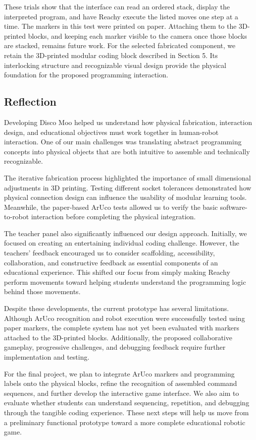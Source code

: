 \documentclass[conference]{IEEEtran}
\begin{document}
These trials show that the interface can read an ordered stack, display the interpreted program, and have Reachy execute the listed moves one step at a time. The markers in this test were printed on paper. Attaching them to the 3D-printed blocks, and keeping each marker visible to the camera once those blocks are stacked, remains future work. For the selected fabricated component, we retain the 3D-printed modular coding block described in Section 5. Its interlocking structure and recognizable visual design provide the physical foundation for the proposed programming interaction.



\subsection{Reflection}

Developing Disco Moo helped us understand how physical fabrication, interaction design, and educational objectives must work together in human-robot interaction. One of our main challenges was translating abstract programming concepts into physical objects that are both intuitive to assemble and technically recognizable.

The iterative fabrication process highlighted the importance of small dimensional adjustments in 3D printing. Testing different socket tolerances demonstrated how physical connection design can influence the usability of modular learning tools. Meanwhile, the paper-based ArUco tests allowed us to verify the basic software-to-robot interaction before completing the physical integration.

The teacher panel also significantly influenced our design approach. Initially, we focused on creating an entertaining individual coding challenge. However, the teachers' feedback encouraged us to consider scaffolding, accessibility, collaboration, and constructive feedback as essential components of an educational experience. This shifted our focus from simply making Reachy perform movements toward helping students understand the programming logic behind those movements.

Despite these developments, the current prototype has several limitations. Although ArUco recognition and robot execution were successfully tested using paper markers, the complete system has not yet been evaluated with markers attached to the 3D-printed blocks. Additionally, the proposed collaborative gameplay, progressive challenges, and debugging feedback require further implementation and testing.

For the final project, we plan to integrate ArUco markers and programming labels onto the physical blocks, refine the recognition of assembled command sequences, and further develop the interactive game interface. We also aim to evaluate whether students can understand sequencing, repetition, and debugging through the tangible coding experience. These next steps will help us move from a preliminary functional prototype toward a more complete educational robotic game.
\end{document}
